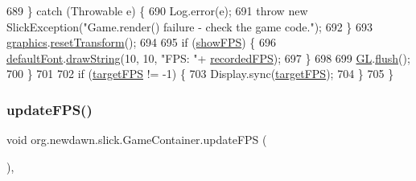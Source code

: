 \begin{DoxyCode}
689             \} \textcolor{keywordflow}{catch} (Throwable e) \{
690                 Log.error(e);
691                 \textcolor{keywordflow}{throw} \textcolor{keyword}{new} SlickException(\textcolor{stringliteral}{"Game.render() failure - check the game code."});
692             \}
693             \mbox{\hyperlink{classorg_1_1newdawn_1_1slick_1_1_game_container_ab33d45e90ae9dcfcfd9c7a907415a58b}{graphics}}.\mbox{\hyperlink{classorg_1_1newdawn_1_1slick_1_1_graphics_af9c31d95040f9acd36eaa449c33e5c12}{resetTransform}}();
694             
695             \textcolor{keywordflow}{if} (\mbox{\hyperlink{classorg_1_1newdawn_1_1slick_1_1_game_container_a21f562c31b09838dbfb2f21048f093c6}{showFPS}}) \{
696                 \mbox{\hyperlink{classorg_1_1newdawn_1_1slick_1_1_game_container_a42d2acd12fa335270fdea3fd9d739d55}{defaultFont}}.\mbox{\hyperlink{interfaceorg_1_1newdawn_1_1slick_1_1_font_a40b19381efcb64ce1ce4d446eff1e350}{drawString}}(10, 10, \textcolor{stringliteral}{"FPS: "}+
      \mbox{\hyperlink{classorg_1_1newdawn_1_1slick_1_1_game_container_a1b65e4d07aaae2b711971a95e55667be}{recordedFPS}});
697             \}
698             
699             \mbox{\hyperlink{classorg_1_1newdawn_1_1slick_1_1_game_container_a38d69b28b32e0b7e99555b8ae6061289}{GL}}.\mbox{\hyperlink{interfaceorg_1_1newdawn_1_1slick_1_1opengl_1_1renderer_1_1_s_g_l_a97c40969d74b57d2df86421d53b9c55c}{flush}}();
700         \}
701         
702         \textcolor{keywordflow}{if} (\mbox{\hyperlink{classorg_1_1newdawn_1_1slick_1_1_game_container_a2b2c1237fa5ca2e45a98d70c6196a8b4}{targetFPS}} != -1) \{
703             Display.sync(\mbox{\hyperlink{classorg_1_1newdawn_1_1slick_1_1_game_container_a2b2c1237fa5ca2e45a98d70c6196a8b4}{targetFPS}});
704         \}
705     \}
\end{DoxyCode}
\mbox{\label{classorg_1_1newdawn_1_1slick_1_1_game_container_a3894fc3250d4731e4218bc69bfc281df}} 
\subsubsection{\texorpdfstring{update\+F\+P\+S()}{updateFPS()}}
{\footnotesize\ttfamily void org.\+newdawn.\+slick.\+Game\+Container.\+update\+F\+PS (\begin{DoxyParamCaption}{ }\end{DoxyParamCaption})\hspace{0.3cm}{\ttfamily [inline]}, {\ttfamily [protected]}}

